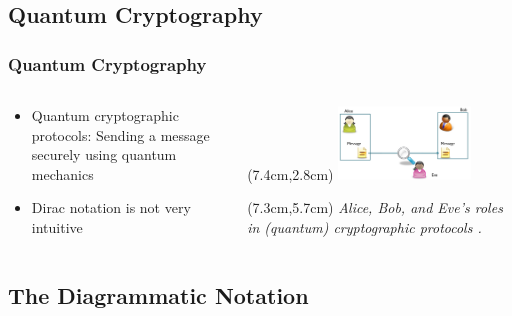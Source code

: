 \documentclass[]{beamer}
\begin{document}
\subsection{Quantum Cryptography}

\begin{frame}
	\frametitle{Quantum Cryptography}
	\begin{columns}
		\begin{column}{0.6\textwidth}
				\begin{itemize}
				\item Quantum cryptographic protocols: Sending a message securely using quantum mechanics
				\vspace{2cm}
				\item Dirac notation is not very intuitive
				\end{itemize}
		\end{column}
	\begin{column}{0.5\textwidth}
		\begin{textblock*}{10cm}(7.4cm,2.8cm)
			\includegraphics[width=0.5\textwidth]{AliceEveBob.png}
		\end{textblock*}
	\begin{textblock*}{6cm}(7.3cm,5.7cm)
		\tiny	\textit{Alice, Bob, and Eve's roles in (quantum) cryptographic protocols \cite{Cunche2011}.}
	\end{textblock*}
	\end{column}
	\end{columns}
\end{frame}

\subsection{The Diagrammatic Notation}
\end{document}
